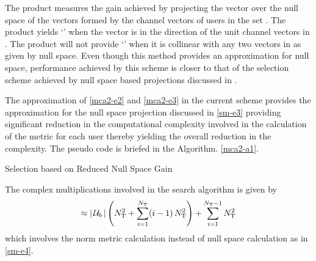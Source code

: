 The product measures the gain achieved by projecting the vector  over the null space of the vectors formed by the channel vectors of users in the set . The product yields `' when the vector  is in the direction of the unit channel vectors in . The product will not provide `' when it is collinear with any two vectors in  as given by null space. Even though this method provides an approximation for null space, performance achieved by this scheme is closer to that of the selection scheme achieved by null space based projections discussed in \cite{sus2006zfbf,antti_user_selection,icsps2010}.

The approximation of \eqref{mca2-e2} and \eqref{mca2-e3} in the current scheme provides the approximation for the null space projection discussed in \eqref{sm-e3} providing significant reduction in the computational complexity involved in the calculation of the metric for each user thereby yielding the overall reduction in the complexity. The pseudo code is briefed in the Algorithm. \ref{mca2-a1}.

\begin{algorithm}
 \SetAlgoLined
 \DontPrintSemicolon
 \caption{Selection based on Reduced Null Space Gain}
 \label{mca2-a1}
\end{algorithm}

The complex multiplications involved in the search algorithm is given by
\begin{equation}
\approx | \, \mathcal{U}_b \, | \left ( N^2_{\mathrm{T}} + \sum^{N_{\mathrm{T}}}_{i = 1} (i - 1) \, N^2_{\mathrm{T}} \right ) + \sum^{N_{\mathrm{T}} - 1}_{i = 1} N^2_{\mathrm{T}}
\label{mca2-e4}
\end{equation}
which involves the norm metric calculation instead of null space calculation as in \eqref{sm-e4}.

